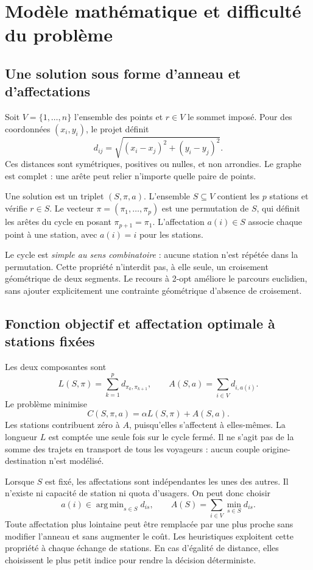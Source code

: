 \chapter{Modèle mathématique et difficulté du problème}
\section{Une solution sous forme d'anneau et d'affectations}
Soit $V=\{1,\ldots,n\}$ l'ensemble des points et $r\in V$ le sommet imposé.
Pour des coordonnées $(x_i,y_i)$, le projet définit
\begin{equation}
d_{ij}=\sqrt{(x_i-x_j)^2+(y_i-y_j)^2}.
\end{equation}
Ces distances sont symétriques, positives ou nulles, et non arrondies. Le graphe
est complet : une arête peut relier n'importe quelle paire de points.

Une solution est un triplet $(S,\pi,a)$. L'ensemble $S\subseteq V$ contient les
$p$ stations et vérifie $r\in S$. Le vecteur $\pi=(\pi_1,\ldots,\pi_p)$ est une
permutation de $S$, qui définit les arêtes du cycle en posant $\pi_{p+1}=\pi_1$.
L'affectation $a(i)\in S$ associe chaque point à une station, avec $a(i)=i$
pour les stations.

Le cycle est \emph{simple au sens combinatoire} : aucune station n'est répétée
dans la permutation. Cette propriété n'interdit pas, à elle seule, un croisement
géométrique de deux segments. Le recours à 2-opt améliore le parcours euclidien,
sans ajouter explicitement une contrainte géométrique d'absence de croisement.

\section{Fonction objectif et affectation optimale à stations fixées}
Les deux composantes sont
\begin{equation}
L(S,\pi)=\sum_{k=1}^{p}d_{\pi_k,\pi_{k+1}},\qquad
A(S,a)=\sum_{i\in V}d_{i,a(i)}.
\end{equation}
Le problème minimise
\begin{equation}\label{eq:objectif}
C(S,\pi,a)=\alpha L(S,\pi)+A(S,a).
\end{equation}
Les stations contribuent zéro à $A$, puisqu'elles s'affectent à elles-mêmes.
La longueur $L$ est comptée une seule fois sur le cycle fermé. Il ne s'agit pas
de la somme des trajets en transport de tous les voyageurs : aucun couple
origine-destination n'est modélisé.

Lorsque $S$ est fixé, les affectations sont indépendantes les unes des autres.
Il n'existe ni capacité de station ni quota d'usagers. On peut donc choisir
\begin{equation}
a(i)\in\mathop{\mathrm{arg\,min}}_{s\in S}d_{is},\qquad
A(S)=\sum_{i\in V}\min_{s\in S}d_{is}.
\end{equation}
Toute affectation plus lointaine peut être remplacée par une plus proche sans
modifier l'anneau et sans augmenter le coût. Les heuristiques exploitent cette
propriété à chaque échange de stations. En cas d'égalité de distance, elles
choisissent le plus petit indice pour rendre la décision déterministe.

